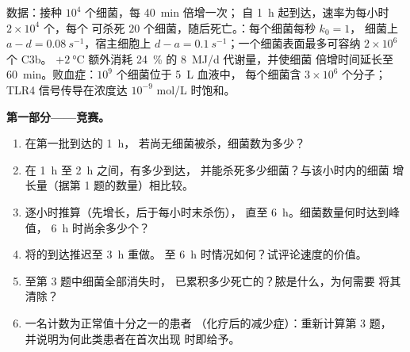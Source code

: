 \begin{problem}
\label{pb:b3:innate-immunity:1}
数据：接种 $10^{4}$ 个细菌，每 \qty{40}{min} 倍增一次；
自 \qty{1}{h} 起到达，速率为每小时 $2\times 10^{4}$ 个，每个
可杀死 $20$ 个细菌，随后死亡。：每个细菌每秒 $k_{0} = 1$，
细菌上 $a - d = \qty{0.08}{s^{-1}}$，宿主细胞上 $d - a =
\qty{0.1}{s^{-1}}$；一个细菌表面最多可容纳
$2\times 10^{6}$ 个 C3b。 $+\qty{2}{\celsius}$ 额外消耗 \qty{24}{\%}
的 \qty{8}{MJ/d} 代谢量，并使细菌
倍增时间延长至 \qty{60}{min}。败血症：$10^{9}$ 个细菌位于 \qty{5}{L} 血液中，
每个细菌含 $3\times 10^{6}$ 个分子；TLR4
信号传导在浓度达 $10^{-9}$ mol/L 时饱和。

\medskip
\noindent\textbf{第一部分——竞赛。}
\begin{enumerate}
  \item 在第一批到达的 \qty{1}{h}，
        若尚无细菌被杀，细菌数为多少？
  \item 在 \qty{1}{h} 至 \qty{2}{h} 之间，有多少到达，
        并能杀死多少细菌？与该小时内的细菌
        增长量（据第 1 题的数量）相比较。
  \item 逐小时推算（先增长，后于每小时末杀伤），
        直至 \qty{6}{h}。细菌数量何时达到峰值，
        \qty{6}{h} 时尚余多少个？
  \item 将的到达推迟至 \qty{3}{h} 重做。
        至 \qty{6}{h} 时情况如何？试评论速度的价值。
  \item 至第 3 题中细菌全部消失时，
        已累积多少死亡的？脓是什么，为何需要
        将其清除？
  \item 一名计数为正常值十分之一的患者
        （化疗后的减少症）：重新计算第 3 题，
        并说明为何此类患者在首次出现
        时即给予。
\end{enumerate}


\end{problem}
